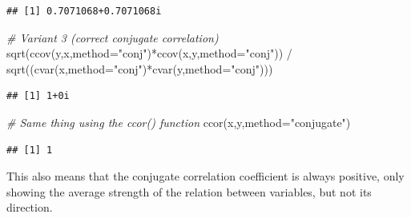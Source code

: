 \documentclass[
]{book}
\newenvironment{Shaded}{\begin{snugshade}}{\end{snugshade}}
\newcommand{\AttributeTok}[1]{\textcolor[rgb]{0.77,0.63,0.00}{#1}}
\newcommand{\CommentTok}[1]{\textcolor[rgb]{0.56,0.35,0.01}{\textit{#1}}}
\newcommand{\FunctionTok}[1]{\textcolor[rgb]{0.00,0.00,0.00}{#1}}
\newcommand{\NormalTok}[1]{#1}
\newcommand{\SpecialCharTok}[1]{\textcolor[rgb]{0.00,0.00,0.00}{#1}}
\newcommand{\StringTok}[1]{\textcolor[rgb]{0.31,0.60,0.02}{#1}}
\begin{document}
\begin{verbatim}
## [1] 0.7071068+0.7071068i
\end{verbatim}

\begin{Shaded}
\begin{Highlighting}[]
\CommentTok{\# Variant 3 (correct conjugate correlation)}
\FunctionTok{sqrt}\NormalTok{(}\FunctionTok{ccov}\NormalTok{(y,x,}\AttributeTok{method=}\StringTok{"conj"}\NormalTok{)}\SpecialCharTok{*}\FunctionTok{ccov}\NormalTok{(x,y,}\AttributeTok{method=}\StringTok{"conj"}\NormalTok{)) }\SpecialCharTok{/}
    \FunctionTok{sqrt}\NormalTok{((}\FunctionTok{cvar}\NormalTok{(x,}\AttributeTok{method=}\StringTok{"conj"}\NormalTok{)}\SpecialCharTok{*}\FunctionTok{cvar}\NormalTok{(y,}\AttributeTok{method=}\StringTok{"conj"}\NormalTok{)))}
\end{Highlighting}
\end{Shaded}

\begin{verbatim}
## [1] 1+0i
\end{verbatim}

\begin{Shaded}
\begin{Highlighting}[]
\CommentTok{\# Same thing using the ccor() function}
\FunctionTok{ccor}\NormalTok{(x,y,}\AttributeTok{method=}\StringTok{"conjugate"}\NormalTok{)}
\end{Highlighting}
\end{Shaded}

\begin{verbatim}
## [1] 1
\end{verbatim}

This also means that the conjugate correlation coefficient is always positive, only showing the average strength of the relation between variables, but not its direction.
\end{document}
